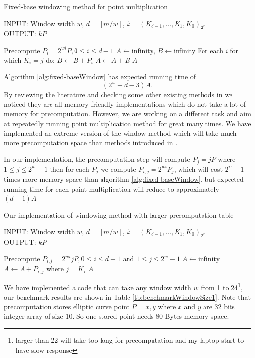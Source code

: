 \begin{algorithm}[h!] 
	\caption{Fixed-base windowing method for point multiplication\cite{hankerson2006guide}}
	\label{alg:fixed-baseWindow}
	INPUT: Window width $w$, $d = [m/w]$, $k=(K_{d-1},\dots,K_1,K_0)_{2^w}$\\
	OUTPUT: $kP$
	\begin{algorithmic} [1]
		\STATE Precompute $P_i = 2^{wi}P, 0 \leq i \leq d-1$
		\STATE $A \leftarrow \text{infinity}$, $B \leftarrow \text{infinity}$
		\STATE For each $i$ for which $K_i = j$ do: $B \leftarrow B + P_i$
		\STATE $A \leftarrow A+B$
		\ENDFOR
		\RETURN $A$
	\end{algorithmic}
\end{algorithm}

Algorithm \ref{alg:fixed-baseWindow} has expected running time of  $$(2^w+d-3)A.$$
By reviewing the literature and checking some other existing methods in \cite{hankerson2006guide} we noticed they are all memory friendly implementations which do not take a lot of memory for precomputation. However, we are working on a different task and aim at repeatedly running point multiplication method for great many times. We have implemented an extreme version of the window method which will take much more precomputation space than methods introduced in \cite{hankerson2006guide}. 

In our implementation, the precomputation step will compute $P_j=jP$ where $ 1 \leq j \leq 2^w-1$ then for each $P_j$ we compute $P_{i,j}=2^{wi}P_j$, which will cost $2^w-1$ times more memory space than algorithm \ref{alg:fixed-baseWindow}, but expected running time for each point multiplication will reduce to approximately $(d-1)A$

\begin{algorithm}[H] 
	\caption{Our implementation of windowing method with larger precomputation table}
	\label{alg:newWindow}
	INPUT: Window width $w$, $d = [m/w]$, $k=(K_{d-1},\dots,K_1,K_0)_{2^w}$\\
	OUTPUT: $kP$
	\begin{algorithmic} [1]
		\STATE Precompute $P_{i,j} = 2^{wi}jP, 0 \leq i \leq d-1$ and $ 1 \leq j \leq 2^w-1$
		\STATE $A \leftarrow \text{infinity}$
		\STATE $A \leftarrow A+P_{i,j}$ where $j = K_i$
		\ENDFOR
		\RETURN $A$
	\end{algorithmic}
\end{algorithm}

We have implemented a code that can take any window width $w$ from 1 to 24\footnote{larger than 22 will take too long for precomputation and my laptop start to have slow response}, our benchmark results are shown in Table \ref{tb:benchmarkWindowSize1}. Note that precomputation stores elliptic curve point $P = {x,y}$ where $x$ and $y$ are 32 bits integer array of size 10. So one stored point needs 80 Bytes memory space. 

